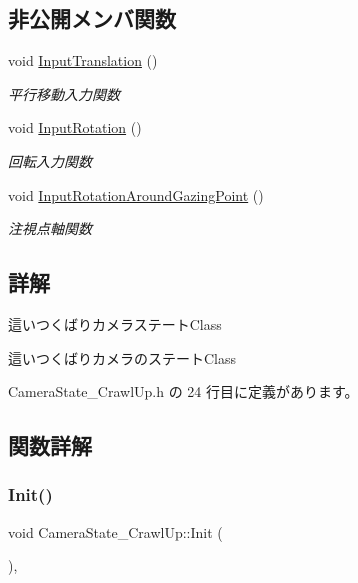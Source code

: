 \subsection*{非公開メンバ関数}
\begin{DoxyCompactItemize}
\item 
void \mbox{\hyperlink{class_camera_state___crawl_up_aca2afe254269bc72330662960a0c6213}{Input\+Translation}} ()
\begin{DoxyCompactList}\small\item\em 平行移動入力関数 \end{DoxyCompactList}\item 
void \mbox{\hyperlink{class_camera_state___crawl_up_a54c4c71c3321cfc85dca2c24c6c29b32}{Input\+Rotation}} ()
\begin{DoxyCompactList}\small\item\em 回転入力関数 \end{DoxyCompactList}\item 
void \mbox{\hyperlink{class_camera_state___crawl_up_a13c5931fb0f12fe441509cf095fa8601}{Input\+Rotation\+Around\+Gazing\+Point}} ()
\begin{DoxyCompactList}\small\item\em 注視点軸関数 \end{DoxyCompactList}\end{DoxyCompactItemize}


\subsection{詳解}
這いつくばりカメラステート\+Class 

這いつくばりカメラのステート\+Class 

 Camera\+State\+\_\+\+Crawl\+Up.\+h の 24 行目に定義があります。



\subsection{関数詳解}
\mbox{\label{class_camera_state___crawl_up_a5b0ed82fd39c7dfe46e36ab151dcd2a1}} 
\subsubsection{\texorpdfstring{Init()}{Init()}}
{\footnotesize\ttfamily void Camera\+State\+\_\+\+Crawl\+Up\+::\+Init (\begin{DoxyParamCaption}{ }\end{DoxyParamCaption})\hspace{0.3cm}{\ttfamily [override]}, {\ttfamily [virtual]}}



